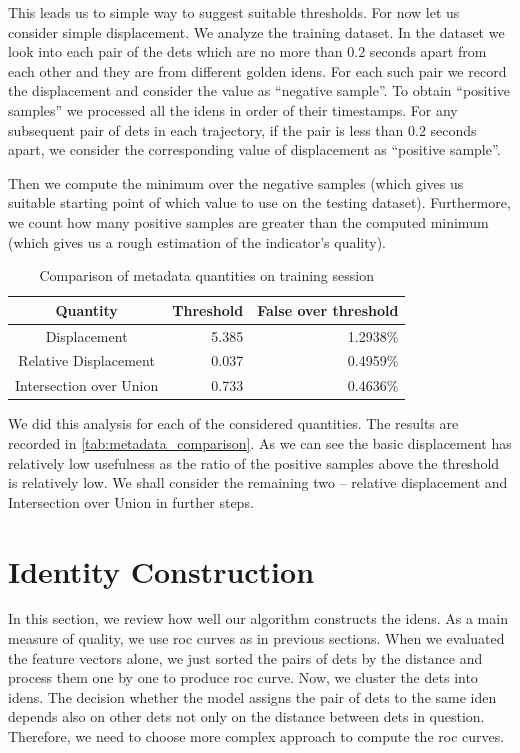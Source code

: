 This leads us to simple way to suggest suitable thresholds. For now let us consider simple displacement. We analyze the training dataset. In the dataset we look into each pair of the \glspl{det} which are no more than 0.2 seconds apart from each other and they are from different golden \glspl{iden}. For each such pair we record the displacement and consider the value as ``negative sample''. To obtain ``positive samples'' we processed all the \glspl{iden} in order of their timestamps. For any subsequent pair of \glspl{det} in each trajectory, if the pair is less than 0.2 seconds apart, we consider the corresponding value of displacement as ``positive sample''.

Then we compute the minimum over the negative samples (which gives us suitable starting point of which value to use on the testing dataset). Furthermore, we count how many positive samples are greater than the computed minimum (which gives us a rough estimation of the indicator's quality).

\begin{table}
    \centering
    \begin{tabular}{c|r|r}
         Quantity & Threshold & False over threshold  \\ \hline
         Displacement & 5.385 & 1.2938\% \\
         Relative Displacement & 0.037 & 0.4959\% \\
         Intersection over Union & 0.733 & 0.4636\%
    \end{tabular}
    \caption{Comparison of metadata quantities on training session}
    \label{tab:metadata_comparison}
\end{table}

We did this analysis for each of the considered quantities. The results are recorded in \autoref{tab:metadata_comparison}. As we can see the basic displacement has relatively low usefulness as the ratio of the positive samples above the threshold is relatively low. We shall consider the remaining two -- relative displacement and Intersection over Union in further steps.

\section{Identity Construction}

In this section, we review how well our algorithm constructs the \glspl{iden}. As a main measure of quality, we use \gls{roc} curves as in previous sections. When we evaluated the feature vectors alone, we just sorted the pairs of \glspl{det} by the distance and process them one by one to produce \gls{roc} curve. Now, we cluster the \glspl{det} into \glspl{iden}. The decision whether the model assigns the pair of \glspl{det} to the same \gls{iden} depends also on other \glspl{det} not only on the distance between \glspl{det} in question. Therefore, we need to choose more complex approach to compute the \gls{roc} curves.

